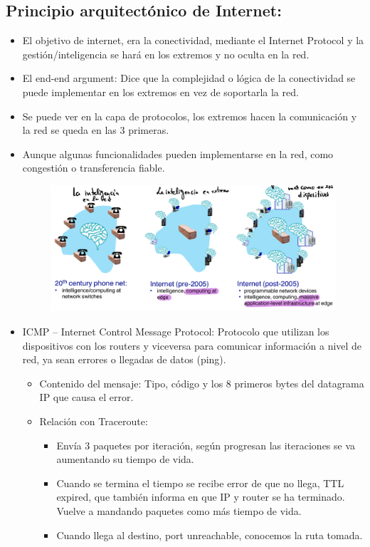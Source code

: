 \documentclass[12pt, twoside, openright]{report} %
\begin{document}
\subsection{Principio arquitectónico de Internet:}

  \begin{itemize}
  \item
    El objetivo de internet, era la conectividad, mediante el Internet
    Protocol y la gestión/inteligencia se hará en los extremos y no
    oculta en la red.
  \item
    El end-end argument: Dice que la complejidad o lógica de la
    conectividad se puede implementar en los extremos en vez de
    soportarla la red.
  \item
    Se puede ver en la capa de protocolos, los extremos hacen la
    comunicación y la red se queda en las 3 primeras.
  \item
    Aunque algunas funcionalidades pueden implementarse en la red, como
    congestión o transferencia fiable.

	\begin{figure}[H]
		{\includegraphics[scale=.35]{Untitled 38.png}}
	\end{figure}
  \item
    ICMP -- Internet Control Message Protocol: Protocolo que utilizan
    los dispositivos con los routers y viceversa para comunicar
    información a nivel de red, ya sean errores o llegadas de datos
    (ping).

    \begin{itemize}
    \item
      Contenido del mensaje: Tipo, código y los 8 primeros bytes del
      datagrama IP que causa el error.
    \item
      Relación con Traceroute:

      \begin{itemize}
      \item
        Envía 3 paquetes por iteración, según progresan las iteraciones
        se va aumentando su tiempo de vida.
      \item
        Cuando se termina el tiempo se recibe error de que no llega, TTL
        expired, que también informa en que IP y router se ha terminado.
        Vuelve a mandando paquetes como más tiempo de vida.
      \item
        Cuando llega al destino, port unreachable, conocemos la ruta
        tomada.
      \end{itemize}
    \end{itemize}
  \end{itemize}
\end{document}
